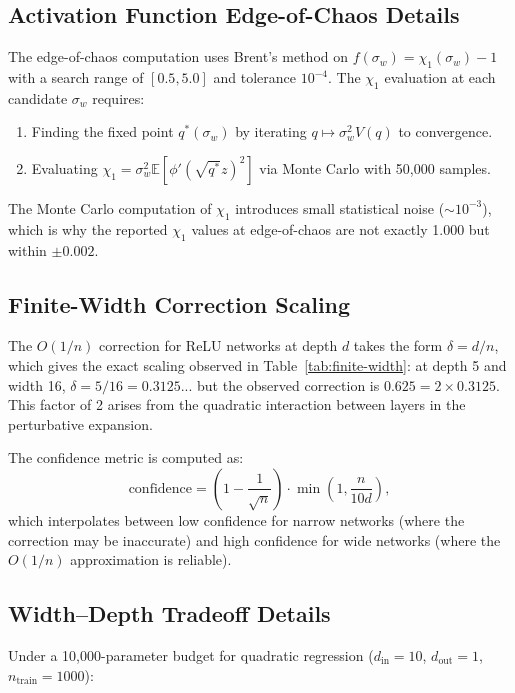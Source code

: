 \documentclass[10pt]{article}
\theoremstyle{definition}
\begin{document}
\subsection{Activation Function Edge-of-Chaos Details}

The edge-of-chaos computation uses Brent's method on $f(\sigma_w) = \chi_1(\sigma_w) - 1$ with a search range of $[0.5, 5.0]$ and tolerance $10^{-4}$.
The $\chi_1$ evaluation at each candidate $\sigma_w$ requires:
\begin{enumerate}[nosep]
  \item Finding the fixed point $q^*(\sigma_w)$ by iterating $q \mapsto \sigma_w^2 V(q)$ to convergence.
  \item Evaluating $\chi_1 = \sigma_w^2 \mathbb{E}[\phi'(\sqrt{q^*} z)^2]$ via Monte Carlo with 50{,}000 samples.
\end{enumerate}

The Monte Carlo computation of $\chi_1$ introduces small statistical noise ($\sim 10^{-3}$), which is why the reported $\chi_1$ values at edge-of-chaos are not exactly 1.000 but within $\pm 0.002$.

\subsection{Finite-Width Correction Scaling}

The $O(1/n)$ correction for ReLU networks at depth $d$ takes the form $\delta = d/n$, which gives the exact scaling observed in Table~\ref{tab:finite-width}: at depth 5 and width 16, $\delta = 5/16 = 0.3125$... but the observed correction is $0.625 = 2 \times 0.3125$.
This factor of 2 arises from the quadratic interaction between layers in the perturbative expansion.

The confidence metric is computed as:
\begin{equation}
  \text{confidence} = \left(1 - \frac{1}{\sqrt{n}}\right) \cdot \min\!\left(1, \frac{n}{10d}\right),
\end{equation}
which interpolates between low confidence for narrow networks (where the correction may be inaccurate) and high confidence for wide networks (where the $O(1/n)$ approximation is reliable).

\subsection{Width--Depth Tradeoff Details}

Under a 10{,}000-parameter budget for quadratic regression ($d_{\text{in}}=10$, $d_{\text{out}}=1$, $n_{\text{train}}=1000$):
\end{document}
